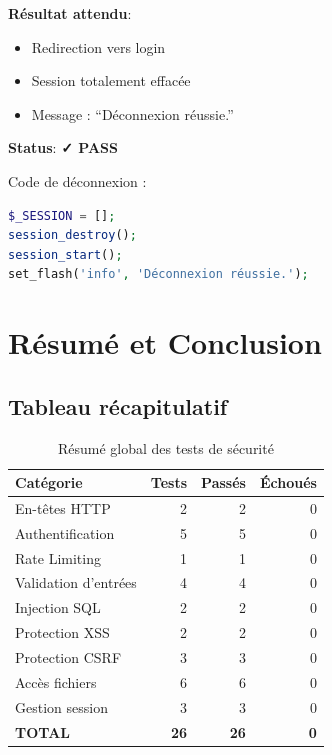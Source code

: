 \documentclass[11pt,a4paper,french]{report}
\newcommand{\pass}{\cellcolor{pass}\textbf{\color{white}✓ PASS}}
\begin{document}
\textbf{Résultat attendu}:
\begin{itemize}
    \item Redirection vers login
    \item Session totalement effacée
    \item Message : ``Déconnexion réussie.''
\end{itemize}

\textbf{Status}: \pass

Code de déconnexion :
\begin{lstlisting}[language=PHP]
$_SESSION = [];
session_destroy();
session_start();
set_flash('info', 'Déconnexion réussie.');
\end{lstlisting}

\newpage


\chapter{Résumé et Conclusion}

\section{Tableau récapitulatif}

\begin{table}[H]
\centering
\caption{Résumé global des tests de sécurité}
\begin{tabular}{|l|r|r|r|}
\hline
\textbf{Catégorie} & \textbf{Tests} & \textbf{Passés} & \textbf{Échoués} \\
\hline
En-têtes HTTP & 2 & 2 & 0 \\
\hline
Authentification & 5 & 5 & 0 \\
\hline
Rate Limiting & 1 & 1 & 0 \\
\hline
Validation d'entrées & 4 & 4 & 0 \\
\hline
Injection SQL & 2 & 2 & 0 \\
\hline
Protection XSS & 2 & 2 & 0 \\
\hline
Protection CSRF & 3 & 3 & 0 \\
\hline
Accès fichiers & 6 & 6 & 0 \\
\hline
Gestion session & 3 & 3 & 0 \\
\hline
\hline
\textbf{TOTAL} & \textbf{26} & \textbf{26} & \textbf{0} \\
\hline
\end{tabular}
\end{table}
\end{document}
